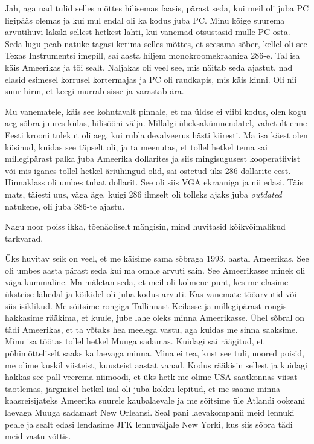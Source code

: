 Jah, aga nad tulid  selles mõttes  hilisemas faasis, pärast seda, kui meil oli 
juba PC ligipääs olemas ja kui mul endal oli ka kodus juba PC. Minu  kõige 
suurema arvutihuvi läkski sellest hetkest lahti, kui vanemad otsustasid mulle 
PC osta. Seda lugu peab natuke tagasi kerima selles mõttes, et seesama sõber, 
kellel oli see Texas Instrumentsi imepill, sai aasta hiljem 
  monokroomekraaniga 286-e. Tal isa käis Ameerikas ja  tõi 
sealt. Naljakas oli veel see, mis näitab seda ajastut, nad elasid esimesel 
korrusel kortermajas ja PC oli raudkapis, mis käis kinni. Oli nii suur hirm, et 
keegi murrab sisse ja varastab ära.


Mu vanematele, käis see kohutavalt pinnale, et ma üldse ei viibi kodus, olen 
kogu aeg sõbra juures külas, hilisööni välja. Millalgi üheksakümnendatel, 
vahetult enne Eesti krooni tulekut oli aeg, kui rubla devalveerus hästi 
kiiresti. Ma isa käest olen küsinud, kuidas see täpselt oli, ja ta meenutas, et 
tollel hetkel tema sai millegipärast palka juba Ameerika dollarites  ja siis 
mingisugusest kooperatiivist või mis iganes tollel hetkel äriühingud olid, sai 
ostetud üks 286 dollarite eest.  Hinnaklass oli umbes tuhat dollarit. See oli 
siis VGA ekraaniga ja nii edasi. Täis mats, täiesti uus, väga äge, kuigi 286 
ilmselt oli tolleks ajaks juba \emph{outdated}  natukene,  oli juba 386-te 
ajastu.


Nagu noor poiss ikka, tõenäoliselt mängisin, mind huvitasid kõikvõimalikud 
tarkvarad. 

Üks huvitav seik on veel, et me käisime sama sõbraga 1993. aastal Ameerikas. 
See oli umbes aasta pärast seda kui ma omale arvuti sain. See Ameerikasse 
minek oli väga kummaline. Ma mäletan seda, et meil oli  kolmene punt, kes me 
elasime üksteise lähedal ja  kõikidel oli juba kodus arvuti. Kas vanemate 
tööarvutid või siis isiklikud. Me sõitsime rongiga Tallinnast Keilasse ja 
millegipärast rongis hakkasime rääkima, et kuule, jube lahe oleks minna 
Ameerikasse. Ühel sõbral on tädi Ameerikas, et ta võtaks hea meelega vastu, aga 
kuidas me sinna saaksime. Minu isa töötas tollel hetkel Muuga 
sadamas. Kuidagi sai räägitud, et põhimõtteliselt saaks ka 
laevaga minna. Mina ei tea, kust see tuli, noored poisid, me olime kuskil 
viisteist, kuusteist aastat vanad. Kodus rääkisin sellest ja kuidagi hakkas see 
pall veerema niimoodi, et üks hetk me olime USA saatkonnas viisat taotlemas, 
järgmisel hetkel isal oli juba kokku lepitud, et me saame minna kaasreisijateks 
Ameerika suurele kaubalaevale ja me sõitsime üle Atlandi ookeani laevaga Muuga 
sadamast New Orleansi. Seal pani laevakompanii meid lennuki peale ja sealt 
edasi lendasime JFK lennuväljale New Yorki, kus siis sõbra tädi meid vastu 
võttis. 

